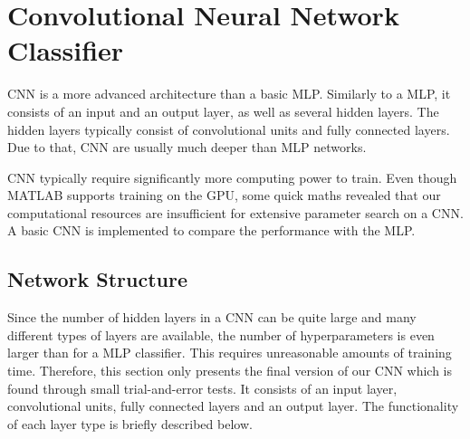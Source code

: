 \section{Convolutional Neural Network Classifier} \label{sec:CNN}
	\pagestyle{mario}

CNN is a more advanced architecture than a basic MLP. Similarly to a MLP, it consists of an input and an output layer, as well as several hidden layers. The hidden layers typically consist of convolutional units and fully connected layers. Due to that, CNN are usually much deeper than MLP networks.

CNN typically require significantly more computing power to train. Even though MATLAB supports training on the GPU, some quick maths revealed that our computational resources are insufficient for extensive parameter search on a CNN. A basic CNN is implemented to compare the performance with the MLP.

\subsection{Network Structure}

Since the number of hidden layers in a CNN can be quite large and many different types of layers are available, the number of hyperparameters is even larger than for a MLP classifier. This requires unreasonable amounts of training time. Therefore, this section only presents the final version of our CNN which is found through small trial-and-error tests. It consists of an input layer, convolutional units, fully connected layers and an output layer. The functionality of each layer type is briefly described below.

